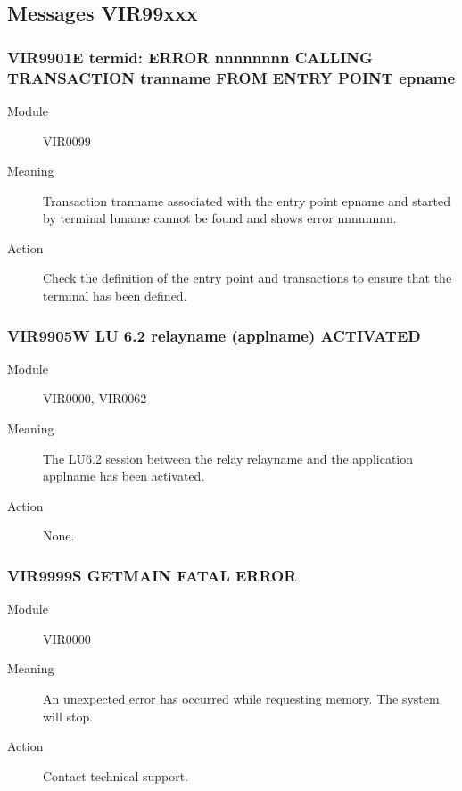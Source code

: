 \documentclass[letterpaper,10pt,english]{sphinxmanual}
\begin{document}
\subsection{Messages VIR99xxx}
\label{\detokenize{messages:messages-vir99xxx}}

\subsubsection{VIR9901E termid: ERROR nnnnnnnn CALLING TRANSACTION tranname FROM ENTRY POINT epname}
\label{\detokenize{messages:vir9901e-termid-error-nnnnnnnn-calling-transaction-tranname-from-entry-point-epname}}\begin{description}
\item[{Module}] \leavevmode
VIR0099

\item[{Meaning}] \leavevmode
Transaction tranname associated with the entry point epname and started by terminal luname cannot be found and shows error nnnnnnnn.

\item[{Action}] \leavevmode
Check the definition of the entry point and transactions to ensure that the terminal has been defined.

\end{description}


\subsubsection{VIR9905W LU 6.2 relayname (applname) ACTIVATED}
\label{\detokenize{messages:vir9905w-lu-6-2-relayname-applname-activated}}\begin{description}
\item[{Module}] \leavevmode
VIR0000, VIR0062

\item[{Meaning}] \leavevmode
The LU6.2 session between the relay relayname and the application applname has been activated.

\item[{Action}] \leavevmode
None.

\end{description}


\subsubsection{VIR9999S GETMAIN FATAL ERROR}
\label{\detokenize{messages:vir9999s-getmain-fatal-error}}\begin{description}
\item[{Module}] \leavevmode
VIR0000

\item[{Meaning}] \leavevmode
An unexpected error has occurred while requesting memory. The system will stop.

\item[{Action}] \leavevmode
Contact technical support.

\end{description}
\end{document}
